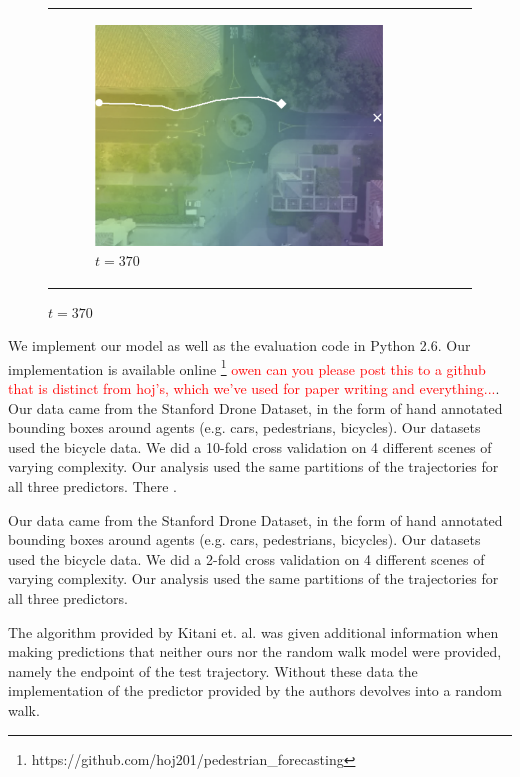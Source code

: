 \documentclass[letterpaper,10pt,conference]{ieeeconf}
\newcommand{\Ram}[1]{\textcolor{red}{#1}}
\begin{document}
\begin{figure}
\begin{tabular}{M{.1\linewidth}  M{.3\linewidth} M{.3\linewidth}  M{.3\linewidth}}
	\begin{subfigure}[b]{\linewidth} \includegraphics[width=\linewidth]{./figures/comparison/rand_death_1_2_t=370.png}
		\caption{$t=370$}
	\end{subfigure}
	\label{fig:death-1-2}
	
	\end{tabular}
\end{figure}
We implement our model as well as the evaluation code in Python 2.6. 
Our implementation is available online \footnote{https://github.com/hoj201/pedestrian\_forecasting} \Ram{owen can you please post this to a github that is distinct from hoj's, which we've used for paper writing and everything...}.
Our data came from the Stanford Drone Dataset, in the form of hand annotated bounding boxes around agents (e.g. cars, pedestrians, bicycles). 
Our datasets used the bicycle data. 
We did a 10-fold cross validation on 4 different scenes of varying complexity. 
Our analysis used the same partitions of the trajectories for all three predictors. There .%

Our data came from the Stanford Drone Dataset, in the form of hand annotated bounding boxes around agents (e.g. cars, pedestrians, bicycles). Our datasets used the bicycle data. We did a 2-fold cross validation on 4 different scenes of varying complexity. Our analysis used the same partitions of the trajectories for all three predictors.

The algorithm provided by Kitani et. al. was given additional information when making predictions that neither ours nor the random walk model were provided, namely the endpoint of the test trajectory. Without these data the implementation of the predictor provided by the authors devolves into a random walk.
\end{document}
